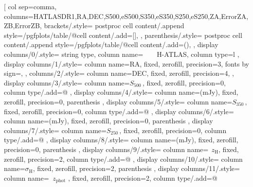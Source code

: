 
\begin{table}[!ht]
\centering
\pgfplotstabletypeset[
    col sep=comma,
    columns={HATLASDR1,RA,DEC,S500,eS500,S350,eS350,S250,eS250,ZA,ErrorZA,ZB,ErrorZB},
    brackets/.style={
        postproc cell content/.append style={/pgfplots/table/@cell content/.add={\relax[}{]}},
    },
    parenthesis/.style={
        postproc cell content/.append style={/pgfplots/table/@cell content/.add={\relax(}{)}},
    },
    display columns/0/.style={
        string type,
        column name={$\qquad$H-ATLAS},
        column type={l}%
    },
    display columns/1/.style={
        column name={RA},
        fixed,
        zerofill,
        precision=3,
        fonts by sign={}{\color{red}},
    },
    columns/2/.style={
        column name={DEC},
        fixed,
        zerofill,
        precision=4,
    },
    display columns/3/.style={
        column name={$S_{500}\,$},
        fixed,
        zerofill,
        precision=0,
        column type/.add={}{@{\hspace{0mm}}}
    },
    display columns/4/.style={
        column name={\scriptsize{(mJy)}},
        fixed,
        zerofill,
        precision=0,
        parenthesis
    },
    display columns/5/.style={
        column name={$S_{350}\,$},
        fixed,
        zerofill,
        precision=0,
        column type/.add={}{@{\hspace{0mm}}}
    },
    display columns/6/.style={
        column name={\scriptsize{(mJy)}},
        fixed,
        zerofill,
        precision=0,
        parenthesis
    },
    display columns/7/.style={
        column name={$S_{250}\,$},
        fixed,
        zerofill,
        precision=0,
        column type/.add={}{@{\hspace{0mm}}}
    },
    display columns/8/.style={
        column name={\scriptsize{(mJy)}},
        fixed,
        zerofill,
        precision=0,
        parenthesis
    },
    display columns/9/.style={
        column name={$\;\,{z}_{\mathrm{H}}$},
        fixed,
        zerofill,
        precision=2,
        column type/.add={}{@{\hspace{1mm}}}
    },
    display columns/10/.style={
        column name={${\sigma}_{\mathrm{H}}$},
        fixed,
        zerofill,
        precision=2,
        parenthesis
    },
    display columns/11/.style={
        column name={$\;\;{z}_{\mathrm{phot}}$ },
        fixed,
        zerofill,
        precision=2,
        column type/.add={}{@{\hspace{1mm}}}
}
\end{table}
